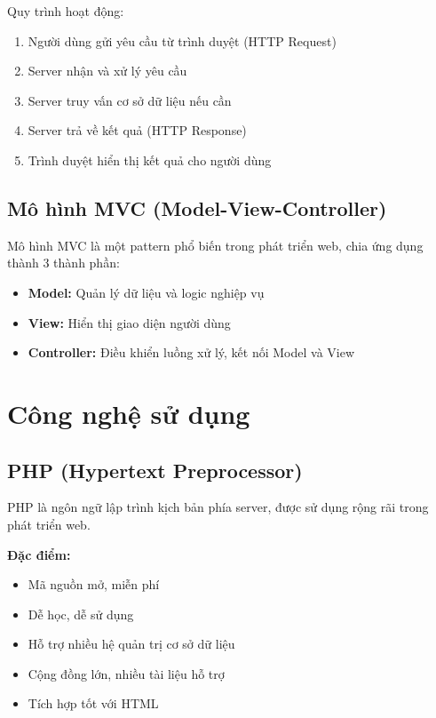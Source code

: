 \documentclass[12pt,a4paper]{report}
\begin{document}
Quy trình hoạt động:
\begin{enumerate}
    \item Người dùng gửi yêu cầu từ trình duyệt (HTTP Request)
    \item Server nhận và xử lý yêu cầu
    \item Server truy vấn cơ sở dữ liệu nếu cần
    \item Server trả về kết quả (HTTP Response)
    \item Trình duyệt hiển thị kết quả cho người dùng
\end{enumerate}

\subsection{Mô hình MVC (Model-View-Controller)}

Mô hình MVC là một pattern phổ biến trong phát triển web, chia ứng dụng thành 3 thành phần:

\begin{itemize}
    \item \textbf{Model:} Quản lý dữ liệu và logic nghiệp vụ
    \item \textbf{View:} Hiển thị giao diện người dùng
    \item \textbf{Controller:} Điều khiển luồng xử lý, kết nối Model và View
\end{itemize}

\section{Công nghệ sử dụng}

\subsection{PHP (Hypertext Preprocessor)}

PHP là ngôn ngữ lập trình kịch bản phía server, được sử dụng rộng rãi trong phát triển web.

\textbf{Đặc điểm:}
\begin{itemize}
    \item Mã nguồn mở, miễn phí
    \item Dễ học, dễ sử dụng
    \item Hỗ trợ nhiều hệ quản trị cơ sở dữ liệu
    \item Cộng đồng lớn, nhiều tài liệu hỗ trợ
    \item Tích hợp tốt với HTML
\end{itemize}
\end{document}
